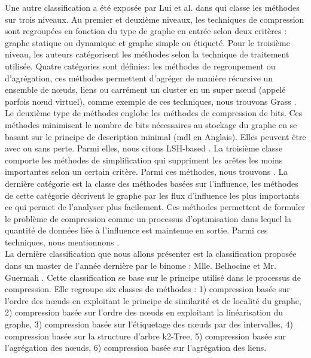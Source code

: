 Une autre classification a été exposée par Lui et al. dans \citep{liu2018graph} qui classe les méthodes sur trois niveaux. Au premier et deuxième niveaux, les techniques de compression sont regroupées en fonction du type de graphe en entrée selon deux critères : graphe statique ou dynamique et graphe simple ou étiqueté. Pour le troisième niveau, les auteurs catégorisent les méthodes selon la technique de traitement utilisée. Quatre catégories sont définies: les méthodes de regroupement ou d'agrégation, ces méthodes permettent d'agréger de manière récursive un ensemble de nœuds, liens ou carrément un cluster en un super nœud (appelé parfois nœud virtuel), comme exemple de ces techniques, nous trouvons Grass \citep{lefevre2010grass}. Le deuxième type de méthodes englobe les méthodes de compression de bits. Ces méthodes minimisent le nombre de bits nécessaires au stockage du graphe en se basant sur 
le principe de description minimal (\gls{mdl} en Anglais). Elles peuvent être avec ou sans perte. Parmi elles, nous citons LSH-based \citep{khan2014set}. La troisième classe comporte les méthodes de simplification qui suppriment les arêtes les moins importantes selon un certain critère. Parmi ces méthodes, nous trouvons \citep{shen2006visual}. La dernière catégorie est la classe des méthodes basées sur l'influence, les méthodes de cette catégorie décrivent le graphe par les flux d'influence les plus importants ce qui permet de l'analyser plus facilement. Ces méthodes permettent de formuler le problème de compression comme un processus d'optimisation dans lequel la quantité de données liée à l'influence est maintenue en sortie. Parmi ces techniques, nous mentionnons \citep{shi2015vegas}.\\


La dernière classification que nous allons présenter est la classification proposée dans un master de l'année dernière par le binome : Mlle. Belhocine et Mr. Guermah \citep{master2017}. Cette classification se base sur le principe utilisé dans le processus de compression. Elle regroupe six classes de méthodes : 1) compression basée sur l'ordre des nœuds en exploitant le principe de similarité et de localité du graphe, 2) compression basée sur l'ordre des nœuds en exploitant la linéarisation du graphe, 3) compression basée sur l'étiquetage des nœuds par des intervalles, 4) compression basée sur la structure d'arbre k2-Tree, 5) compression basée sur l'agrégation des nœuds, 6) compression basée sur l'agrégation des liens.

